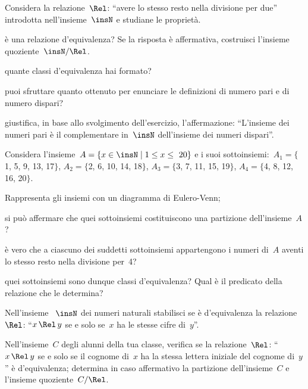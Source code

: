 \begin{multicols}{2}
\begin{esercizio}
\label{ese:B.34}
Considera la relazione~$\Rel$: ``avere lo stesso resto nella divisione per due'' introdotta nell'insieme~$\insN$ e studiane le proprietà.
\begin{itemize*}
\item è una relazione d'equivalenza? Se la risposta è affermativa, costruisci l'insieme quoziente~$\insN/\Rel$.
\item quante classi d'equivalenza hai formato?
\item puoi sfruttare quanto ottenuto per enunciare le definizioni di numero pari e di numero dispari?
\item giustifica, in base allo svolgimento dell'esercizio, l'affermazione: ``L'insieme dei numeri pari è il
complementare in~$\insN$ dell'insieme dei numeri dispari''.
\end{itemize*}
\end{esercizio}

\begin{esercizio}
\label{ese:B.35}
Considera l'insieme~$A = \{x\in\insN \mid  1 \le x \le~20 \}$ e i suoi
sottoinsiemi:~$A_1 =\{$1, 5, 9, 13, 17$\}$, $A_2 =\{$2, 6, 10, 14, 18$\}$, $A_3 =\{$3, 7, 11, 15, 19$\}$, $A_4 =\{$4, 8, 12, 16, 20$\}$.
\begin{enumeratea}
\item Rappresenta gli insiemi con un diagramma di Eulero-Venn;
\item si può affermare che quei sottoinsiemi costituiscono una partizione dell'insieme~$A$?
\item è vero che a ciascuno dei suddetti sottoinsiemi appartengono i numeri di~$A$ aventi lo stesso resto nella divisione per~4?
\item quei sottoinsiemi sono dunque classi d'equivalenza? Qual è il predicato della relazione che le determina?
\end{enumeratea}
\end{esercizio}

\begin{esercizio}
\label{ese:B.36}
Nell'insieme ~$\insN$ dei numeri naturali stabilisci se è d'equivalenza la relazione~$\Rel$: ``$x \,\Rel\, y$ se e solo se~$x$ ha le stesse cifre di~$y$''.
\end{esercizio}

\begin{esercizio}
\label{ese:B.37}
Nell'insieme~$C$ degli alunni della tua classe, verifica se la relazione~$\Rel$: ``$x \,\Rel\, y$ se e solo se il cognome di~$x$ ha la stessa lettera iniziale del
cognome di~$y$'' è d'equivalenza; determina in caso affermativo la partizione dell'insieme~$C$ e l'insieme quoziente~$C/\Rel$.
\end{esercizio}


\end{multicols}
